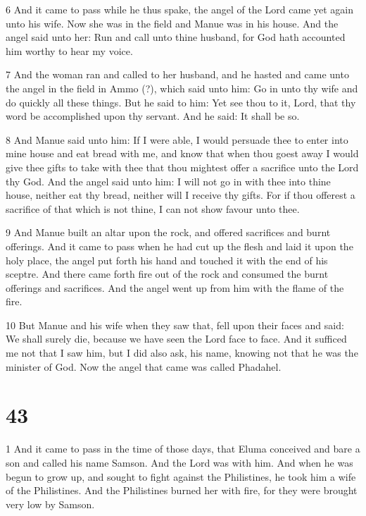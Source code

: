 \par 6 And it came to pass while he thus spake, the angel of the Lord came yet again unto his wife. Now she was in the field and Manue was in his house. And the angel said unto her: Run and call unto thine husband, for God hath accounted him worthy to hear my voice. 

\par 7 And the woman ran and called to her husband, and he hasted and came unto the angel in the field in Ammo (?), which said unto him: Go in unto thy wife and do quickly all these things. But he said to him: Yet see thou to it, Lord, that thy word be accomplished upon thy servant. And he said: It shall be so. 

\par 8 And Manue said unto him: If I were able, I would persuade thee to enter into mine house and eat bread with me, and know that when thou goest away I would give thee gifts to take with thee that thou mightest offer a sacrifice unto the Lord thy God. And the angel said unto him: I will not go in with thee into thine house, neither eat thy bread, neither will I receive thy gifts. For if thou offerest a sacrifice of that which is not thine, I can not show favour unto thee. 

\par 9 And Manue built an altar upon the rock, and offered sacrifices and burnt offerings. And it came to pass when he had cut up the flesh and laid it upon the holy place, the angel put forth his hand and touched it with the end of his sceptre. And there came forth fire out of the rock and consumed the burnt offerings and sacrifices. And the angel went up from him with the flame of the fire. 

\par 10 But Manue and his wife when they saw that, fell upon their faces and said: We shall surely die, because we have seen the Lord face to face. And it sufficed me not that I saw him, but I did also ask, his name, knowing not that he was the minister of God. Now the angel that came was called Phadahel.



\chapter{43}

\par 1 And it came to pass in the time of those days, that Eluma conceived and bare a son and called his name Samson. And the Lord was with him. And when he was begun to grow up, and sought to fight against the Philistines, he took him a wife of the Philistines. And the Philistines burned her with fire, for they were brought very low by Samson.

